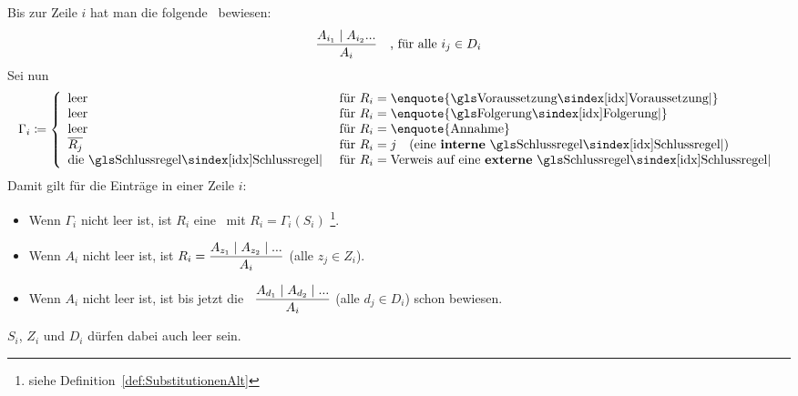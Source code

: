 {Bis zur Zeile $i$ hat man die folgende \Schlussregel\ bewiesen:
\[ \frac{A_{i_1} \mathrel{\mid} A_{i_2} ...}{A_i} \quad \text{, für alle } i_j \in D_i \]
Sei nun
\[
	\Gamma_i \defeq
	\left\{
		\begin{array}{ll}
			\text{leer}    & \text{ für } R_i = \text{\enquote{\Voraussetzung}} \\
			\text{leer}    & \text{ für } R_i = \text{\enquote{\Folgerung}}     \\
			\text{leer}    & \text{ für } R_i = \text{\enquote{Annahme}}        \\
			\overline{R_j} & \text{ für } R_i = j \quad \text{(eine \defn{interne} \Schlussregel)} \\
			\text{die \Schlussregel} & \text{ für } R_i = \text{Verweis auf eine \defn{externe} \Schlussregel}
		\end{array}
	\right.
\]
Damit gilt für die Einträge in einer Zeile $i$:
\begin{itemize}
	\item Wenn $\Gamma_i$ nicht leer ist, ist $R_i$ eine \Schlussregel\ mit $R_i = \Gamma_i(S_i)$%
	\footnote{%
		siehe Definition~\eqref{def:SubstitutionenAlt} 
	}.
	\item Wenn $A_i$ nicht leer ist, ist $R_i = \dfrac{A_{z_1} \mathrel{\mid} A_{z_2} \mathrel{\mid} ...}{A_i}$ (alle $z_j \in Z_i$).
	\item Wenn $A_i$ nicht leer ist, ist bis jetzt die \Schlussregel\ $\dfrac{A_{d_1} \mathrel{\mid} A_{d_2} \mathrel{\mid} ...}{A_i}$ (alle $d_j \in D_i$) schon bewiesen.
\end{itemize}
$S_i$, $Z_i$ und $D_i$ dürfen dabei auch leer sein.

}

